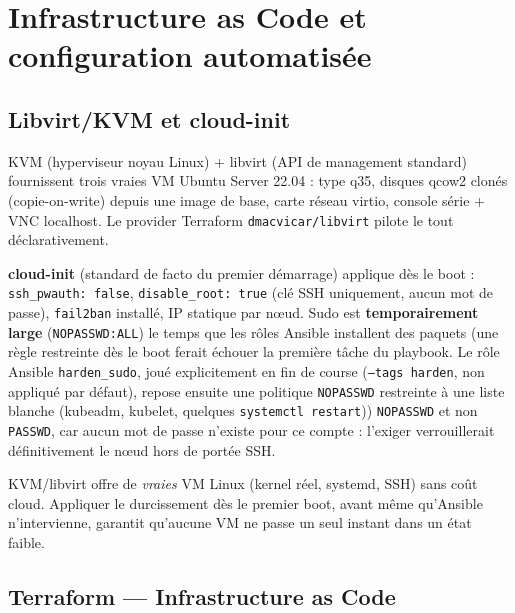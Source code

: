 \documentclass[12pt,a4paper,oneside]{report}
\begin{document}
\chapter[Infrastructure as Code et configuration]{Infrastructure as Code et configuration automatisée}

\section{Libvirt/KVM et cloud-init}

KVM (hyperviseur noyau Linux) + libvirt (API de management standard) fournissent trois vraies VM Ubuntu Server 22.04 : type q35, disques qcow2 clonés (copie-on-write) depuis une image de base, carte réseau virtio, console série + VNC localhost. Le provider Terraform \texttt{dmacvicar/libvirt} pilote le tout déclarativement.

\textbf{cloud-init} (standard de facto du premier démarrage) applique dès le boot : \texttt{ssh\_pwauth: false}, \texttt{disable\_root: true} (clé SSH uniquement, aucun mot de passe), \texttt{fail2ban} installé, IP statique par nœud. Sudo est \textbf{temporairement large} (\texttt{NOPASSWD:ALL}) le temps que les rôles Ansible installent des paquets (une règle restreinte dès le boot ferait échouer la première tâche du playbook. Le rôle Ansible \texttt{harden\_sudo}, joué explicitement en fin de course (\texttt{--tags harden}, non appliqué par défaut), repose ensuite une politique \texttt{NOPASSWD} restreinte à une liste blanche (kubeadm, kubelet, quelques \texttt{systemctl restart})) \texttt{NOPASSWD} et non \texttt{PASSWD}, car aucun mot de passe n'existe pour ce compte : l'exiger verrouillerait définitivement le nœud hors de portée SSH.

\begin{whybox}
KVM/libvirt offre de \emph{vraies} VM Linux (kernel réel, systemd, SSH) sans coût cloud. Appliquer le durcissement dès le premier boot, avant même qu'Ansible n'intervienne, garantit qu'aucune VM ne passe un seul instant dans un état faible.
\end{whybox}

\section{Terraform --- Infrastructure as Code}
\end{document}
